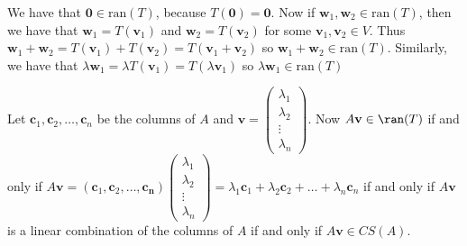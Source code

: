 \documentclass{report}
\begin{document}

\begin{myproof}
    We have that $\mathbf{0} \in \mathrm{ran}(T)$, because $T(\mathbf{0})= \mathbf{0}$. Now if $\mathbf{w}_1, \mathbf{w}_2 \in \mathrm{ran}(T)$, then we have that $\mathbf{w}_1 = T(\mathbf{v}_1)$ and $\mathbf{w}_2 = T(\mathbf{v}_2)$ for some $\mathbf{v}_1, \mathbf{v}_2 \in V$. Thus $ \mathbf{w}_1 + \mathbf{w}_2 = T(\mathbf{v}_1) + T(\mathbf{v}_2) = T( \mathbf{v}_1 + \mathbf{v}_2)$ so $\mathbf{w}_1 + \mathbf{w}_2 \in \mathrm{ran}(T).$ Similarly, we have that $ \lambda \mathbf{w}_1 = \lambda T(\mathbf{v}_1) = T( \lambda \mathbf{v}_1)$ so $ \lambda \mathbf{w}_1 \in \mathrm{ran}(T)$
\end{myproof}


\begin{myproof}
    Let $\mathbf{c}_1, \mathbf{c}_2, \ldots, \mathbf{c}_n$ be the columns of $A$ and  $\mathbf{v} =  \begin{pmatrix} \lambda _1 \\ \lambda _2 \\ \vdots \\ \lambda _n \end{pmatrix} $. Now $A \mathbf{v} \in \ran (T)$ if and only if $A \mathbf{v} = \left( \mathbf{c}_1, \mathbf{c}_2, \ldots, \mathbf{c_n} \right) \begin{pmatrix} \lambda _1 \\ \lambda _2 \\ \vdots \\ \lambda _n \end{pmatrix} = \lambda _1 \mathbf{c}_1 + \lambda _2 \mathbf{c}_2 + \ldots + \lambda _n \mathbf{c}_n $
    if and only if $A\mathbf{v}$ is a linear combination of the columns of $A$ if and only if  $A\mathbf{v} \in CS(A)$. 
\end{myproof}

\end{document}
